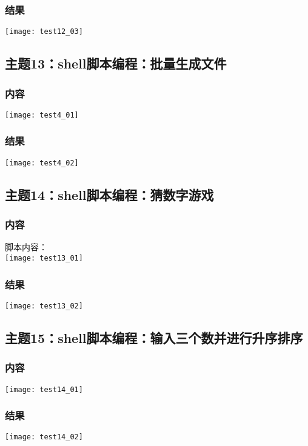 \documentclass{article}
\begin{document}
\subsubsection{结果}  
\texttt{[image: test12\_03]}\\
\vspace{1cm}
\subsection{主题13：shell脚本编程：批量生成文件}  
\subsubsection{内容}
\texttt{[image: test4\_01]}\\
\subsubsection{结果}  
\texttt{[image: test4\_02]}\\
\vspace{1cm}
\subsection{主题14：shell脚本编程：猜数字游戏}  
\subsubsection{内容}
脚本内容：\\
\texttt{[image: test13\_01]}\\
\subsubsection{结果}  
\texttt{[image: test13\_02]}\\
\newpage
\thispagestyle{empty}
\subsection{主题15：shell脚本编程：输入三个数并进行升序排序}  
\subsubsection{内容}
\texttt{[image: test14\_01]}\\
\subsubsection{结果}  
\texttt{[image: test14\_02]}\\
\vspace{1cm}
\end{document}
